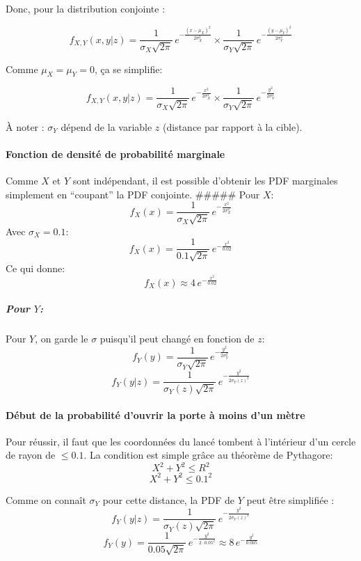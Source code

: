 \documentclass[11pt]{article}
\begin{document}
Donc, pour la distribution conjointe :

\[
f_{X,Y}(x,y|z) =
\frac{1}{\sigma_X \sqrt{2\pi}} \, e^{-\frac{(x-\mu_X)^2}{2\sigma_X^2}}
\times
\frac{1}{\sigma_Y \sqrt{2\pi}} \, e^{-\frac{(y-\mu_Y)^2}{2\sigma_Y^2}}
\]

Comme \(\mu_X = \mu_Y = 0\), ça se simplifie:

\[
f_{X,Y}(x,y|z) =
\frac{1}{\sigma_X \sqrt{2\pi}} \, e^{-\frac{x^2}{2\sigma_X^2}}
\times
\frac{1}{\sigma_Y \sqrt{2\pi}} \, e^{-\frac{y^2}{2\sigma_Y^2}}
\]

À noter : \(\sigma_Y\) dépend de la variable \(z\) (distance par rapport
à la cible).

\paragraph{Fonction de densité de probabilité
marginale}\label{fonction-de-densituxe9-de-probabilituxe9-marginale}

Comme \(X\) et \(Y\) sont indépendant, il est possible d'obtenir les PDF
marginales simplement en ``coupant'' la PDF conjointe. \#\#\#\#\# Pour
\(X\): \[
f_X(x) =
\frac{1}{\sigma_X \sqrt{2\pi}} \, e^{-\frac{x^2}{2\sigma_X^2}}
\] Avec \(\sigma_X = 0.1\): \[
f_X(x) =
\frac{1}{0.1 \sqrt{2\pi}} \, e^{-\frac{x^2}{0.02}}
\] Ce qui donne: \[
f_X(x) \approx 4 \, e^{-\frac{x^2}{0.02}}
\]

\subparagraph{\texorpdfstring{Pour \(Y\):}{Pour Y:}}\label{pour-y}

Pour \(Y\), on garde le \(\sigma\) puisqu'il peut changé en fonction de
\(z\): \[
f_Y(y) =
\frac{1}{\sigma_Y \sqrt{2\pi}} \, e^{-\frac{y^2}{2\sigma_Y^2}}
\] \[
f_Y(y|z) =
\frac{1}{\sigma_Y(z) \sqrt{2\pi}} \, e^{-\frac{y^2}{2\sigma_Y(z)^2}}
\]

\paragraph{Début de la probabilité d'ouvrir la porte à moins d'un
mètre}\label{duxe9but-de-la-probabilituxe9-douvrir-la-porte-uxe0-moins-dun-muxe8tre}

Pour réussir, il faut que les coordonnées du lancé tombent à l'intérieur
d'un cercle de rayon de \(\le 0.1\). La condition est simple grâce au
théorème de Pythagore: \[
X^2 + Y^2 \le R^2
\] \[
X^2 + Y^2 \le 0.1^2
\]

Comme on connaît \(\sigma_Y\) pour cette distance, la PDF de \(Y\) peut
être simplifiée : \[
f_Y(y|z) = \frac{1}{\sigma_Y(z) \sqrt{2\pi}} \, e^{-\frac{y^2}{2\sigma_Y(z)^2}}
\] \[
f_Y(y) = \frac{1}{0.05 \sqrt{2\pi}} \, e^{-\frac{y^2}{2\cdot 0.05^2}} \approx 8 \, e^{-\frac{y^2}{0.005}}
\]
\end{document}
